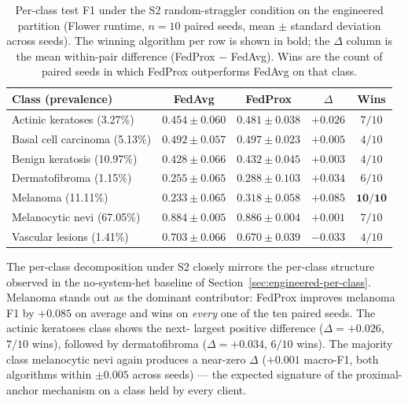 \documentclass[11pt,a4paper]{report}
\begin{document}
\begin{table}[!htbp]
\centering
\caption{Per-class test F1 under the S2 random-straggler
condition on the engineered partition (Flower runtime, $n = 10$
paired seeds, mean $\pm$ standard deviation across seeds).
The winning algorithm per row is shown in bold; the $\Delta$
column is the mean within-pair difference (FedProx $-$ FedAvg).
Wins are the count of paired seeds in which FedProx outperforms
FedAvg on that class.}
\label{tab:sh-c2-per-class}
\small
\begin{tabular}{lcccc}
\toprule
Class (prevalence) & FedAvg & FedProx & $\Delta$ & Wins \\
\midrule
Actinic keratoses (3.27\%)        & $0.454 \pm 0.060$ & $\mathbf{0.481 \pm 0.038}$ & $+0.026$ & $7/10$ \\
Basal cell carcinoma (5.13\%)     & $0.492 \pm 0.057$ & $\mathbf{0.497 \pm 0.023}$ & $+0.005$ & $4/10$ \\
Benign keratosis (10.97\%)        & $0.428 \pm 0.066$ & $\mathbf{0.432 \pm 0.045}$ & $+0.003$ & $4/10$ \\
Dermatofibroma (1.15\%)           & $0.255 \pm 0.065$ & $\mathbf{0.288 \pm 0.103}$ & $+0.034$ & $6/10$ \\
Melanoma (11.11\%)                & $0.233 \pm 0.065$ & $\mathbf{0.318 \pm 0.058}$ & $\mathbf{+0.085}$ & $\mathbf{10/10}$ \\
Melanocytic nevi (67.05\%)        & $0.884 \pm 0.005$ & $\mathbf{0.886 \pm 0.004}$ & $+0.001$ & $7/10$ \\
Vascular lesions (1.41\%)         & $\mathbf{0.703 \pm 0.066}$ & $0.670 \pm 0.039$ & $-0.033$ & $4/10$ \\
\bottomrule
\end{tabular}
\end{table}

The per-class decomposition under S2 closely mirrors the
per-class structure observed in the no-system-het baseline of
Section~\ref{sec:engineered-per-class}. Melanoma stands out as
the dominant contributor: FedProx improves melanoma F1 by
$+0.085$ on average and wins on \emph{every} one of the ten
paired seeds. The actinic keratoses class shows the next-
largest positive difference ($\Delta = +0.026$, $7/10$ wins),
followed by dermatofibroma ($\Delta = +0.034$, $6/10$ wins).
The majority class melanocytic nevi again produces a
near-zero $\Delta$ ($+0.001$ macro-F1, both algorithms within
$\pm 0.005$ across seeds) --- the expected signature of the
proximal-anchor mechanism on a class held by every client.
\end{document}
